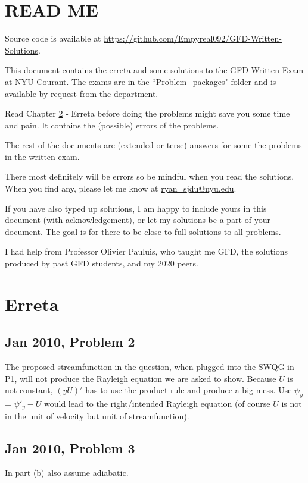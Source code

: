 \documentclass[11pt,letterpaper]{book}
\theoremstyle{definition}
\begin{document}
\renewcommand\thesection{\arabic{section}.}
\renewcommand\thesubsection{(\arabic{section}.\alph{subsection})}

\setcounter{tocdepth}{1}
\tableofcontents

\chapter{READ ME}
Source code is available at \url{https://github.com/Empyreal092/GFD-Written-Solutions}.

This document contains the erreta and some solutions to the GFD Written Exam at NYU Courant. The exams are in the ``Problem\_packages" folder and is available by request from the department.

Read Chapter \ref{chap:erreta} - Erreta before doing the problems might save you some time and pain. It contains the (possible) errors of the problems. 

The rest of the documents are (extended or terse) answers for some the problems in the written exam.

There most definitely will be errors so be mindful when you read the solutions. When you find any, please let me know at \url{ryan_sjdu@nyu.edu}. 

If you have also typed up solutions, I am happy to include yours in this document (with acknowledgement), or let my solutions be a part of your document. The goal is for there to be close to full solutions to all problems. 

I had help from Professor Olivier Pauluis, who taught me GFD, the solutions produced by past GFD students, and my 2020 peers.


\chapter{Erreta}\label{chap:erreta}
\section{Jan 2010, Problem 2}
The proposed streamfunction in the question, when plugged into the SWQG in P1, will not produce the Rayleigh equation we are asked to show. Because $U$ is not constant, $(yU)'$ has to use the product rule and produce a big mess. Use $\psi_y$ = $\psi'_y-U$ would lead to the right/intended Rayleigh equation (of course $U$ is not in the unit of velocity but unit of streamfunction).

\section{Jan 2010, Problem 3}
In part (b) also assume adiabatic.
\end{document}
